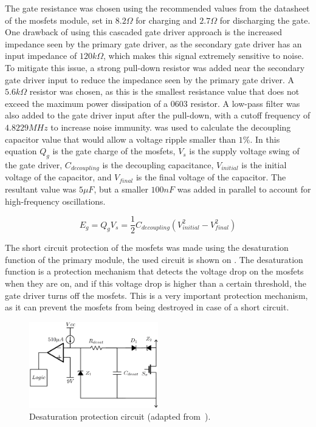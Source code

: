 The gate resistance was chosen using the recommended values from the datasheet of the \glspl{mosfet} module, set in $8.2\Omega$ for charging and $2.7\Omega$ for discharging the gate. One drawback of using this cascaded gate driver approach is the increased impedance seen by the primary gate driver, as the secondary gate driver has an input impedance of $120k\Omega$, which makes this signal extremely sensitive to noise. To mitigate this issue, a strong pull-down resistor was added near the secondary gate driver input to reduce the impedance seen by the primary gate driver. A $5.6k\Omega$ resistor was chosen, as this is the smallest resistance value that does not exceed the maximum power dissipation of a 0603 resistor. A low-pass filter was also added to the gate driver input after the pull-down, with a cutoff frequency of $4.8229MHz$ to increase noise immunity.  was used to calculate the decoupling capacitor value that would allow a voltage ripple smaller than $1\%$. In this equation $Q_g$ is the gate charge of the \glspl{mosfet}, $V_s$ is the supply voltage swing of the gate driver, $C_{decoupling}$ is the decoupling capacitance, $V_{initial}$ is the initial voltage of the capacitor, and $V_{final}$ is the final voltage of the capacitor. The resultant value was $5\mu F$, but a smaller $100nF$ was added in parallel to account for high-frequency oscillations.

\begin {equation}
	E_g = Q_g V_s = \frac{1}{2} C_{decoupling} (V_{initial}^2 - V_{final}^2)
	\label{eq:gate_energy_vs_capacitor}
\end{equation}

The short circuit protection of the \glspl{mosfet} was made using the desaturation function of the primary module, the used circuit is shown on . The desaturation function is a protection mechanism that detects the voltage drop on the \glspl{mosfet} when they are on, and if this voltage drop is higher than a certain threshold, the gate driver turns off the \glspl{mosfet}. This is a very important protection mechanism, as it can prevent the \glspl{mosfet} from being destroyed in case of a short circuit.

\begin{figure}[H]
	\centering
	\includegraphics[width=0.5\textwidth]{Figures/desat_circuit.png}
	\caption{Desaturation protection circuit (adapted from~\cite{Costa:MSc}).}
	\label{fig:desat_circuit}
\end{figure}


